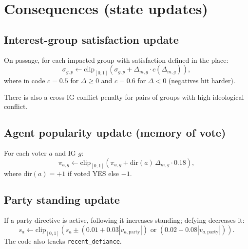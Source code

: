 \documentclass[11pt]{article}
\begin{document}
\section{Consequences (state updates)}
\begin{center}
\end{center}

\subsection{Interest-group satisfaction update}
On passage, for each impacted group with satisfaction defined in the place:
\[
  \sigma_{g,p}\leftarrow \mathrm{clip}_{[0,1]}\left(\sigma_{g,p} + \Delta_{m,g}\cdot c(\Delta_{m,g})\right),
\]
where in code $c=0.5$ for $\Delta\ge 0$ and $c=0.6$ for $\Delta<0$ (negatives hit harder).

There is also a cross-IG conflict penalty for pairs of groups with high ideological conflict.

\subsection{Agent popularity update (memory of vote)}
For each voter $a$ and IG $g$:
\[
  \pi_{a,g} \leftarrow \mathrm{clip}_{[0,1]}\left(\pi_{a,g} + \mathrm{dir}(a)\,\Delta_{m,g}\cdot 0.18\right),
\]
where $\mathrm{dir}(a)=+1$ if voted YES else $-1$.

\subsection{Party standing update}
If a party directive is active, following it increases standing; defying decreases it:
\[
  s_a \leftarrow \mathrm{clip}_{[0,1]}(s_a \pm (0.01 + 0.03|v_{a,\text{party}}|) \text{ or } (0.02 + 0.08|v_{a,\text{party}}|)).
\]
The code also tracks \texttt{recent\_defiance}.
\end{document}
